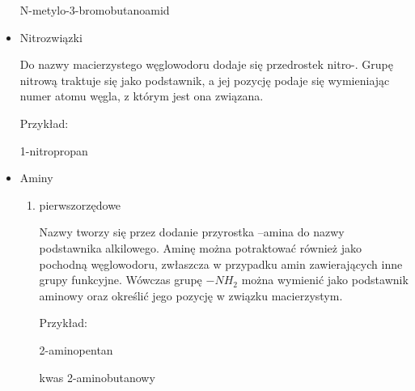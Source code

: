 \begin{itemize}
\begin{center}
       
       N-metylo-3-bromobutanoamid
   \end{center}

    \item Nitrozwiązki
    

    Do nazwy macierzystego węglowodoru dodaje się przedrostek nitro-. Grupę nitrową traktuje się jako podstawnik, a jej pozycję podaje się wymieniając numer atomu węgla, z którym jest ona związana.

    \begin{center}
        Przykład:

       
       1-nitropropan
   \end{center}
   \newpage
    \item Aminy
    \begin{enumerate}
        \item pierwszorzędowe
        

        Nazwy tworzy się przez dodanie przyrostka –amina do nazwy podstawnika alkilowego. Aminę można potraktować również jako pochodną węglowodoru, zwłaszcza w przypadku amin zawierających inne grupy funkcyjne. Wówczas grupę $-NH_2$ można wymienić jako podstawnik aminowy oraz określić jego pozycję w związku macierzystym.

        \begin{center}
            Przykład:
    
           
           2-aminopentan
       \end{center}

       \begin{center}
        
       
            kwas 2-aminobutanowy
        \end{center}

        \begin{center}
        
       

\end{center}
\end{enumerate}
\end{itemize}
